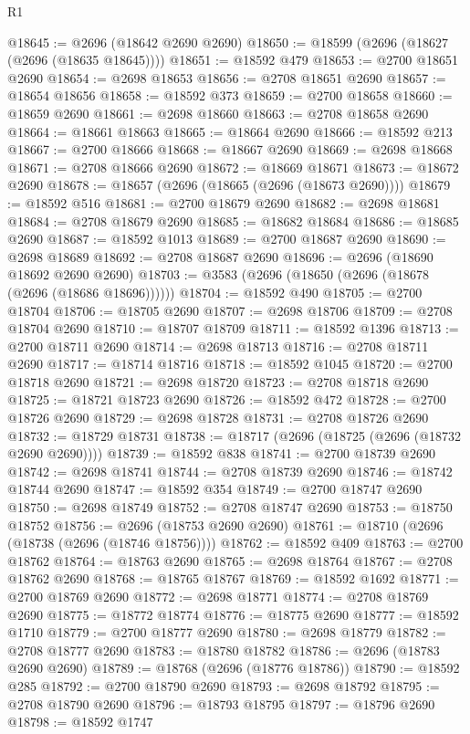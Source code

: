 \begin{lexlean}{R1}
\begin{coremodule}
@18645 := @2696 (@18642 @2690 @2690)
@18650 := @18599 (@2696 (@18627 (@2696 (@18635 @18645))))
@18651 := @18592 @479
@18653 := @2700 @18651 @2690
@18654 := @2698 @18653
@18656 := @2708 @18651 @2690
@18657 := @18654 @18656
@18658 := @18592 @373
@18659 := @2700 @18658
@18660 := @18659 @2690
@18661 := @2698 @18660
@18663 := @2708 @18658 @2690
@18664 := @18661 @18663
@18665 := @18664 @2690
@18666 := @18592 @213
@18667 := @2700 @18666
@18668 := @18667 @2690
@18669 := @2698 @18668
@18671 := @2708 @18666 @2690
@18672 := @18669 @18671
@18673 := @18672 @2690
@18678 := @18657 (@2696 (@18665 (@2696 (@18673 @2690))))
@18679 := @18592 @516
@18681 := @2700 @18679 @2690
@18682 := @2698 @18681
@18684 := @2708 @18679 @2690
@18685 := @18682 @18684
@18686 := @18685 @2690
@18687 := @18592 @1013
@18689 := @2700 @18687 @2690
@18690 := @2698 @18689
@18692 := @2708 @18687 @2690
@18696 := @2696 (@18690 @18692 @2690 @2690)
@18703 := @3583 (@2696 (@18650 (@2696 (@18678 (@2696 (@18686 @18696))))))
@18704 := @18592 @490
@18705 := @2700 @18704
@18706 := @18705 @2690
@18707 := @2698 @18706
@18709 := @2708 @18704 @2690
@18710 := @18707 @18709
@18711 := @18592 @1396
@18713 := @2700 @18711 @2690
@18714 := @2698 @18713
@18716 := @2708 @18711 @2690
@18717 := @18714 @18716
@18718 := @18592 @1045
@18720 := @2700 @18718 @2690
@18721 := @2698 @18720
@18723 := @2708 @18718 @2690
@18725 := @18721 @18723 @2690
@18726 := @18592 @472
@18728 := @2700 @18726 @2690
@18729 := @2698 @18728
@18731 := @2708 @18726 @2690
@18732 := @18729 @18731
@18738 := @18717 (@2696 (@18725 (@2696 (@18732 @2690 @2690))))
@18739 := @18592 @838
@18741 := @2700 @18739 @2690
@18742 := @2698 @18741
@18744 := @2708 @18739 @2690
@18746 := @18742 @18744 @2690
@18747 := @18592 @354
@18749 := @2700 @18747 @2690
@18750 := @2698 @18749
@18752 := @2708 @18747 @2690
@18753 := @18750 @18752
@18756 := @2696 (@18753 @2690 @2690)
@18761 := @18710 (@2696 (@18738 (@2696 (@18746 @18756))))
@18762 := @18592 @409
@18763 := @2700 @18762
@18764 := @18763 @2690
@18765 := @2698 @18764
@18767 := @2708 @18762 @2690
@18768 := @18765 @18767
@18769 := @18592 @1692
@18771 := @2700 @18769 @2690
@18772 := @2698 @18771
@18774 := @2708 @18769 @2690
@18775 := @18772 @18774
@18776 := @18775 @2690
@18777 := @18592 @1710
@18779 := @2700 @18777 @2690
@18780 := @2698 @18779
@18782 := @2708 @18777 @2690
@18783 := @18780 @18782
@18786 := @2696 (@18783 @2690 @2690)
@18789 := @18768 (@2696 (@18776 @18786))
@18790 := @18592 @285
@18792 := @2700 @18790 @2690
@18793 := @2698 @18792
@18795 := @2708 @18790 @2690
@18796 := @18793 @18795
@18797 := @18796 @2690
@18798 := @18592 @1747

\end{coremodule}
\end{lexlean}
